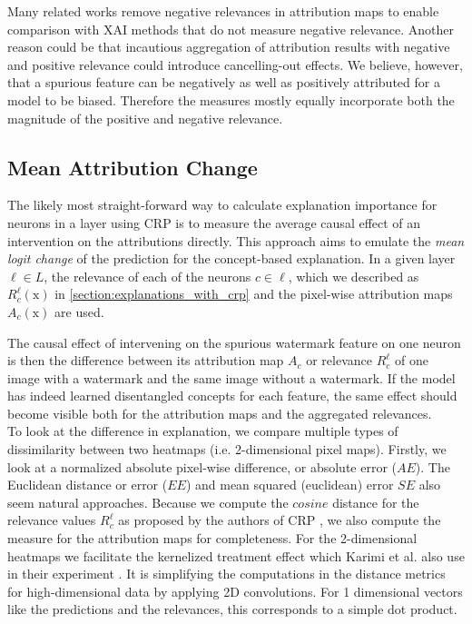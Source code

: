 Many related works remove negative relevances in attribution maps to enable comparison with XAI methods that do not measure negative relevance. Another reason could be that incautious aggregation of attribution results with negative and positive relevance could introduce cancelling-out effects. We believe, however, that a spurious feature can be negatively as well as positively attributed for a model to be biased. Therefore the measures mostly equally incorporate both the magnitude of the positive and negative relevance. 

\subsection{Mean Attribution Change}
The likely most straight-forward way to calculate explanation importance for neurons in a layer using CRP is to measure the average causal effect of an intervention on the attributions directly. This approach aims to emulate the \textit{mean logit change} of the prediction for the concept-based explanation. In a given layer $\ell \in L$, the relevance of each of the neurons $c \in \ell$, which we described as $R_c^{\ell}(\mathrm{x})$ in \cref{section:explanations_with_crp} and the pixel-wise attribution maps $A_c(\mathrm{x})$ are used.

The causal effect of intervening on the spurious watermark feature on one neuron is then the difference between its attribution map $A_c$ or relevance $R_c^{\ell}$ of one image with a watermark and the same image without a watermark. If the model has indeed learned disentangled concepts for each feature, the same effect should become visible both for the attribution maps and the aggregated relevances.\\

To look at the difference in explanation, we compare multiple types of dissimilarity between two heatmaps (i.e. 2-dimensional pixel maps). Firstly, we look at a normalized absolute pixel-wise difference, or absolute error ($AE$). The Euclidean distance or error ($EE$) and mean squared (euclidean) error $SE$ also seem natural approaches. Because we compute the $cosine$ distance for the relevance values $R_c^{\ell}$ as proposed by the authors of CRP \cite{Achtibat2023}, we also compute the measure for the attribution maps for completeness.
For the 2-dimensional heatmaps we facilitate the kernelized treatment effect which Karimi et al. also use in their experiment \cite{Karimi2023}. It is simplifying the computations in the distance metrics for high-dimensional data by applying 2D convolutions. For 1 dimensional vectors like the predictions and the relevances, this corresponds to a simple dot product. \\ 

